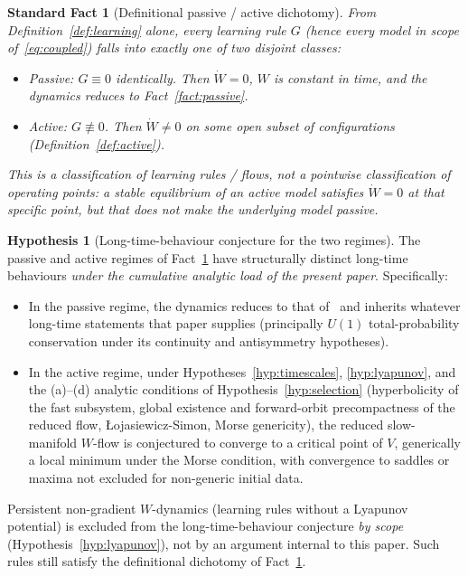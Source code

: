 \documentclass[11pt]{article}
\newtheorem{fact}[theorem]{Standard Fact}
\theoremstyle{definition}
\newtheorem{hypothesis}[theorem]{Hypothesis}
\begin{document}
\begin{fact}[Definitional passive / active dichotomy]\label{fact:classification}
From Definition~\ref{def:learning} alone, every learning rule $G$ (hence every model in scope of~\eqref{eq:coupled}) falls into exactly one of two disjoint classes:
\begin{itemize}
    \item \emph{Passive}: $G \equiv 0$ identically. Then $\dot W = 0$, $W$ is constant in time, and the dynamics reduces to Fact~\ref{fact:passive}.
    \item \emph{Active}: $G \not\equiv 0$. Then $\dot W \neq 0$ on some open subset of configurations (Definition~\ref{def:active}).
\end{itemize}
This is a classification of \emph{learning rules / flows}, not a pointwise classification of operating points: a stable equilibrium of an active model satisfies $\dot W = 0$ at that specific point, but that does not make the underlying model passive.
\end{fact}

\begin{hypothesis}[Long-time-behaviour conjecture for the two regimes]\label{prop:classification}
The passive and active regimes of Fact~\ref{fact:classification} have structurally distinct long-time behaviours \emph{under the cumulative analytic load of the present paper}. Specifically:
\begin{itemize}
    \item In the passive regime, the dynamics reduces to that of~\citep{SmartTransportLaw} and inherits whatever long-time statements that paper supplies (principally $U(1)$ total-probability conservation under its continuity and antisymmetry hypotheses).
    \item In the active regime, under Hypotheses~\ref{hyp:timescales}, \ref{hyp:lyapunov}, and the (a)--(d) analytic conditions of Hypothesis~\ref{hyp:selection} (hyperbolicity of the fast subsystem, global existence and forward-orbit precompactness of the reduced flow, {\L}ojasiewicz-Simon, Morse genericity), the reduced slow-manifold $W$-flow is conjectured to converge to a critical point of $V$, generically a local minimum under the Morse condition, with convergence to saddles or maxima not excluded for non-generic initial data.
\end{itemize}
Persistent non-gradient $W$-dynamics (learning rules without a Lyapunov potential) is excluded from the long-time-behaviour conjecture \emph{by scope} (Hypothesis~\ref{hyp:lyapunov}), not by an argument internal to this paper. Such rules still satisfy the definitional dichotomy of Fact~\ref{fact:classification}.
\end{hypothesis}
\end{document}
